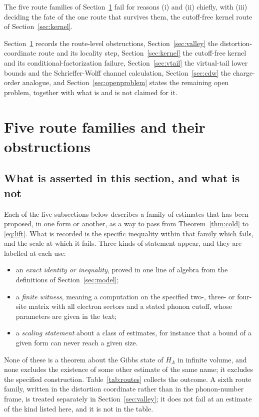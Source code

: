 \documentclass[11pt]{article}
\theoremstyle{definition}
\theoremstyle{remark}
\begin{document}
The five route families of Section~\ref{sec:routes} fail for reasons (i) and (ii)
chiefly, with (iii) deciding the fate of the one route that survives them, the
cutoff-free kernel route of Section~\ref{sec:kernel}.

Section~\ref{sec:routes} records the route-level obstructions,
Section~\ref{sec:valley} the distortion-coordinate route and its locality step,
Section~\ref{sec:kernel} the cutoff-free kernel and its conditional-factorization
failure, Section~\ref{sec:vtail} the virtual-tail lower bounds and the
Schrieffer-Wolff channel calculation, Section~\ref{sec:cdw} the charge-order
analogue, and Section~\ref{sec:openproblem} states the remaining open problem,
together with what is and is not claimed for it.

\section{Five route families and their obstructions}
\label{sec:routes}

\subsection{What is asserted in this section, and what is not}

Each of the five subsections below describes a family of estimates that has been
proposed, in one form or another, as a way to pass from Theorem~\ref{thm:cold} to
\eqref{eq:lift}. What is recorded is the specific inequality within that family
which fails, and the scale at which it fails. Three kinds of statement appear, and
they are labelled at each use:
\begin{itemize}[leftmargin=1.4em]
\item an \emph{exact identity or inequality}, proved in one line of algebra from
the definitions of Section~\ref{sec:model};
\item a \emph{finite witness}, meaning a computation on the specified two-, three-
or four-site matrix with all electron sectors and a stated phonon cutoff, whose
parameters are given in the text;
\item a \emph{scaling statement} about a class of estimates, for instance that a
bound of a given form can never reach a given size.
\end{itemize}
None of these is a theorem about the Gibbs state of $H_{\Lambda}$ in infinite
volume, and none excludes the existence of some other estimate of the same name;
it excludes the specified construction. Table~\ref{tab:routes} collects the
outcome. A sixth route family, written in the distortion coordinate rather than
in the phonon-number frame, is treated separately in Section~\ref{sec:valley}; it
does not fail at an estimate of the kind listed here, and it is not in the table.
\end{document}
